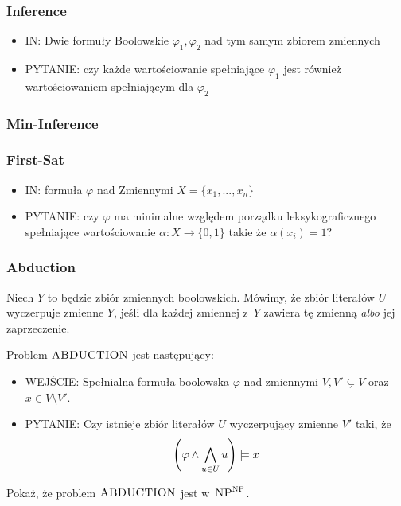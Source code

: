 \subsubsection{Inference}
\begin{itemize}
	\item IN: Dwie formuły Boolowskie \(\varphi_1, \varphi_2\) nad tym samym zbiorem zmiennych
	\item PYTANIE: czy każde wartościowanie spełniające \(\varphi_1\) jest również
	      wartościowaniem spełniającym dla \(\varphi_2\)
\end{itemize}



\subsubsection{Min-Inference}

\subsubsection{First-Sat}
\begin{itemize}
	\item IN: formuła \(\varphi\) nad Zmiennymi \(X = \{x_1, ..., x_n\} \)
	\item PYTANIE: czy \(\varphi\) ma minimalne względem porządku leksykograficznego spełniające wartościowanie \(\alpha : X \rightarrow \{0, 1\}\) takie że \( \alpha(x_i) = 1?\)
\end{itemize}

\subsubsection{Abduction}
\begin{definition}
	Niech \(Y\) to będzie zbiór zmiennych boolowskich. Mówimy, że zbiór literałów \(U\) wyczerpuje zmienne \(Y\), jeśli dla każdej zmiennej z~\(Y\) zawiera tę zmienną \emph{albo} jej zaprzeczenie.
\end{definition}
Problem \(\textsc{ABDUCTION}\) jest następujący:
\begin{itemize}
	\item WEJŚCIE: Spełnialna formuła boolowska \(\varphi\) nad zmiennymi \(V, V' \subsetneq V\) oraz \(x \in V \setminus V'\).
	\item PYTANIE: Czy istnieje zbiór literałów \(U\) wyczerpujący zmienne \(V'\) taki, że
	      \[
		      \left(\varphi \land \bigwedge_{u \in U}u\right) \models x
	      \]
\end{itemize}
Pokaż, że problem \(\textsc{ABDUCTION}\) jest w~\(\textsc{NP}^{\textsc{NP}}\).

